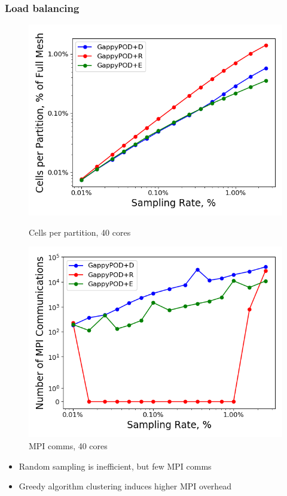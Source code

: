 \documentclass[]{beamer}
\begin{document}
\begin{frame}\frametitle{Load balancing}
	\begin{figure}
		\begin{minipage}{0.49\linewidth}
			\includegraphics[width=0.99\linewidth]{experiments/box/partitionSamplingTypeStudy_partition_stats.png}
			\caption*{Cells per partition, 40 cores}
		\end{minipage}
		\begin{minipage}{0.49\linewidth}
			\includegraphics[width=0.99\linewidth]{experiments/box/partitionSamplingTypeStudy_partition_comms.png}
			\caption*{MPI comms, 40 cores}
		\end{minipage}
	\end{figure}
	\begin{itemize}
		\item Random sampling is inefficient, but few MPI comms
		\item Greedy algorithm clustering induces higher MPI overhead
	\end{itemize}
\end{frame}
\end{document}
